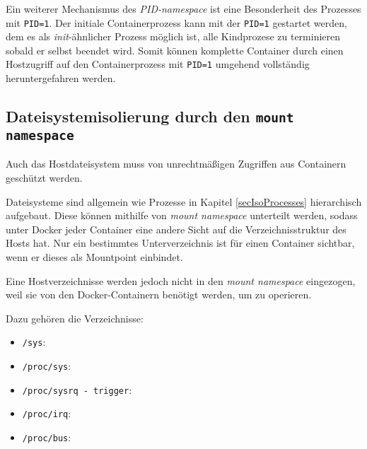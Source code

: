 \documentclass[../main.tex]{subfiles}
\begin{document}
			Ein weiterer Mechanismus des \emph{\acrshort{PID}-namespace} ist eine Besonderheit des Prozesses mit \texttt{PID=1}. Der initiale Containerprozess kann mit der \texttt{PID=1} gestartet werden, dem es als \emph{init}-ähnlicher Prozess möglich ist, alle Kindprozese zu terminieren sobald er selbst beendet wird. Somit können komplette Container durch einen Hostzugriff auf den Containerprozess mit \texttt{PID=1} umgehend vollständig heruntergefahren werden.

			\cite[S.4]{dockerSec1}




    \subsection{Dateisystemisolierung durch den \texttt{mount namespace}}
			Auch das Hostdateisystem muss von unrechtmäßigen Zugriffen aus Containern geschützt werden.

			Dateisysteme sind allgemein wie Prozesse in Kapitel \ref{secIsoProcesses} hierarchisch aufgebaut. Diese können mithilfe von \emph{mount namespace} unterteilt werden, sodass unter Docker jeder Container eine andere Sicht auf die Verzeichnisstruktur des Hosts hat. Nur ein bestimmtes Unterverzeichnis ist für einen Container sichtbar, wenn er dieses als Mountpoint einbindet.

			Eine Hostverzeichnisse werden jedoch nicht in den \emph{mount namespace} eingezogen, weil sie von den Docker-Containern benötigt werden, um zu operieren.

			Dazu gehören die Verzeichnisse:

			\begin{itemize}
				\item \texttt{/sys}:
				\item \texttt{/proc/sys}:
				\item \texttt{/proc/sysrq - trigger}:
				\item \texttt{/proc/irq}:
				\item \texttt{/proc/bus}:
			\end{itemize}
\end{document}
